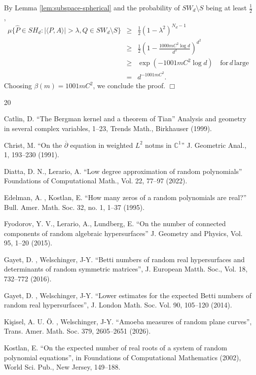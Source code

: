 \documentclass [11pt]{amsart}
\theoremstyle{remark}
\numberwithin{equation}{section}
\numberwithin{theorem}{section}
\begin{document}
\noindent By Lemma \ref{lem:subspace-spherical} and the probability of $SW_{d}\setminus S$ being at least $\displaystyle{\frac{1}{2}}$,
\begin{eqnarray*}
\mu\big\{ \widehat{P}\in SH_d: |\langle P, A\rangle |>\lambda, Q\in SW_{d}\setminus S \big\}
&\geq& \frac{1}{2}(1-\lambda^2)^{N_d-1} \\
&\geq&\frac{1}{2}\left(1-\frac{1000mC^2 \log d}{d^2}\right)^{d^2}\\
&\geq&\exp(-1001mC^2\log d) \quad \mathrm{for}\, d\, \mathrm{large}\\
&=& d^{-1001mC^2}.
\end{eqnarray*}
Choosing $\beta(m)=1001mC^2$, we conclude the proof. \hfill $\Box$
\begin{thebibliography}{20}

 Catlin, D. ``The Bergman kernel and a theorem of Tian'' Analysis and geometry in several complex variables, 1--23, Trends Math., Birkhauser (1999).

 Christ, M. ``On the $\overline{\partial}$ equation in weighted $L^2$ notms in $\mathbb{C}^1$'' J. Geometric Anal., 1, 193--230 (1991).

 Diatta, D. N.,  Lerario, A. ``Low degree approximation of random polynomials'' Foundations of Computational Math., Vol. 22, 77--97 (2022).

 Edelman, A. , Kostlan, E. ``How many zeros of a random polynomials are real?'' Bull. Amer. Math. Soc. 32, no. 1, 1--37 (1995). 

 Fyodorov, Y. V., Lerario, A., Lundberg, E. ``On the number of connected components of random algebraic hypersurfaces''  J. Geometry and Physics, Vol. 95, 1--20 (2015). 

 Gayet, D. , Welschinger, J-Y.  ``Betti numbers of random real hypersurfaces and determinants of random symmetric matrices'', J. European Matth. Soc., Vol. 18, 732--772 (2016).

 Gayet, D. , Welschinger, J-Y. ``Lower estimates for the expected Betti numbers of random real hypersurfaces'', J. London Math. Soc. Vol. 90, 105--120 (2014). 

 Kişisel, A. U. Ö. , Welschinger, J-Y. ``Amoeba measures of random plane curves'', Trans. Amer. Math. Soc. 379, 2605--2651 (2026). 

 Kostlan, E. ``On the expected number of real roots of a system of random polynomial equations'', in Foundations of Computational Mathematics (2002), World Sci. Pub., New Jersey, 149--188.


\end{thebibliography}
\end{document}
